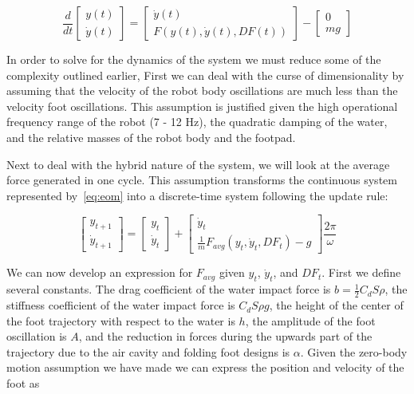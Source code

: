 \begin{equation}
	\frac{d}{dt} \begin{bmatrix} y(t) \\ \dot{y}(t) \end{bmatrix} = \begin{bmatrix} \dot{y}(t) \\ F(y(t),\dot{y}(t), DF(t)) \end{bmatrix} - \begin{bmatrix} 0 \\ mg \end{bmatrix}
	\label{eq:eom}
\end{equation}

In order to solve for the dynamics of the system we must reduce some of the complexity outlined earlier, First we can deal with the curse of dimensionality by assuming that the velocity of the robot body oscillations are much less than the velocity foot oscillations. This assumption is justified given the high operational frequency range of the robot (7 - 12 Hz), the quadratic damping of the water, and the relative masses of the robot body and the footpad.
	
Next to deal with the hybrid nature of the system, we will look at the average force generated in one cycle. This assumption transforms the continuous system represented by~\ref{eq:eom} into a discrete-time system following the update rule:

\begin{equation}
	\begin{bmatrix} y_{t+1} \\ \dot{y}_{t+1} \end{bmatrix} = \begin{bmatrix} y_{t} \\ \dot{y}_{t} \end{bmatrix} + \begin{bmatrix}  \dot{y}_t \\ \frac{1}{m} F_{avg}(y_t,\dot{y}_t, DF_t) - g \end{bmatrix} \frac{2 \pi}{\omega}
	\label{eq:eom_discrete}
\end{equation}

We can now develop an expression for $F_{avg}$ given $y_t$, $\dot{y}_t$, and $DF_t$. First we define several constants. The drag coefficient of the water impact force is $b = \frac{1}{2} C_d S \rho$, the stiffness coefficient of the water impact force is $C_d S \rho g$, the height of the center of the foot trajectory with respect to the water is $h$, the amplitude of the foot oscillation is $A$, and the reduction in forces during the upwards part of the trajectory due to the air cavity and folding foot designs is $\alpha$. Given the zero-body motion assumption we have made we can express the position and velocity of the foot as


